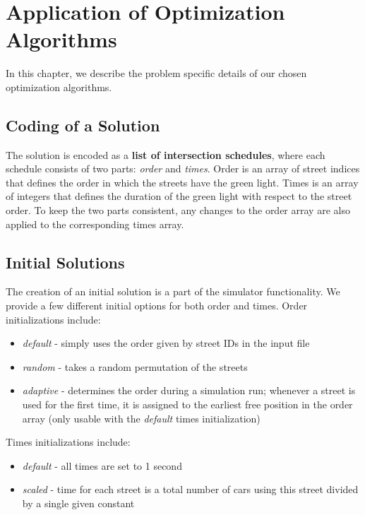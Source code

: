 \chapter{Application of Optimization Algorithms}

In this chapter, we describe the problem specific details of our chosen optimization algorithms.

\section{Coding of a Solution} \label{sec:coding_of_a_solution}

The solution is encoded as a \textbf{list of intersection schedules}, where each schedule consists of two parts: \textit{order} and \textit{times}. Order is an array of street indices that defines the order in which the streets have the green light. Times is an array of integers that defines the duration of the green light with respect to the street order. To keep the two parts consistent, any changes to the order array are also applied to the corresponding times array.

\section{Initial Solutions} \label{sec:initial_solutions}

The creation of an initial solution is a part of the simulator functionality. We provide a few different initial options for both order and times. Order initializations include:
\begin{itemize}
    \item \textit{default} - simply uses the order given by street IDs in the input file
    \item \textit{random} - takes a random permutation of the streets
    \item \textit{adaptive} - determines the order during a simulation run; whenever a street is used for the first time, it is assigned to the earliest free position in the order array (only usable with the \textit{default} times initialization)
\end{itemize}
Times initializations include:
\begin{itemize}
    \item \textit{default} - all times are set to 1 second
    \item \textit{scaled} - time for each street is a total number of cars using this street divided by a single given constant
\end{itemize}


